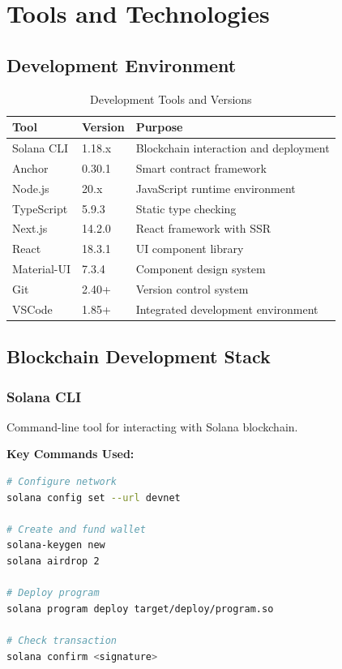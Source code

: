 \documentclass[a4paper,13pt,twoside]{report}
\theoremstyle{definition}
\begin{document}
\section{Tools and Technologies}

\subsection{Development Environment}

\begin{table}[h]
\centering
\caption{Development Tools and Versions}
\begin{tabular}{|l|l|l|}
\hline
\textbf{Tool} & \textbf{Version} & \textbf{Purpose} \\
\hline
Solana CLI & 1.18.x & Blockchain interaction and deployment \\
Anchor & 0.30.1 & Smart contract framework \\
Node.js & 20.x & JavaScript runtime environment \\
TypeScript & 5.9.3 & Static type checking \\
Next.js & 14.2.0 & React framework with SSR \\
React & 18.3.1 & UI component library \\
Material-UI & 7.3.4 & Component design system \\
Git & 2.40+ & Version control system \\
VSCode & 1.85+ & Integrated development environment \\
\hline
\end{tabular}
\end{table}

\subsection{Blockchain Development Stack}

\subsubsection{Solana CLI}

Command-line tool for interacting with Solana blockchain.

\textbf{Key Commands Used:}
\begin{lstlisting}[language=bash, caption=Solana CLI Commands]
# Configure network
solana config set --url devnet

# Create and fund wallet
solana-keygen new
solana airdrop 2

# Deploy program
solana program deploy target/deploy/program.so

# Check transaction
solana confirm <signature>
\end{lstlisting}
\end{document}
